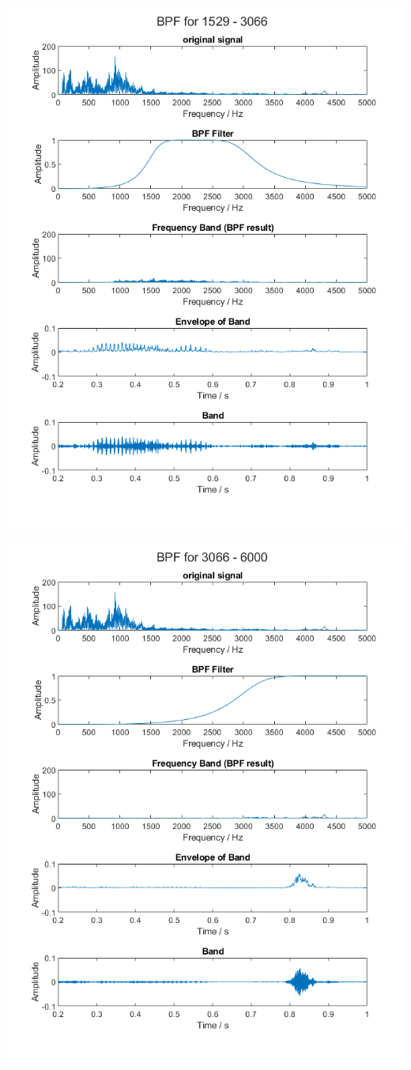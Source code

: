 \documentclass[11pt]{article}
\begin{document}
\includegraphics[height=\textheight]{output/band3.png}

\includegraphics[height=\textheight]{output/band4.png}
\end{document}
